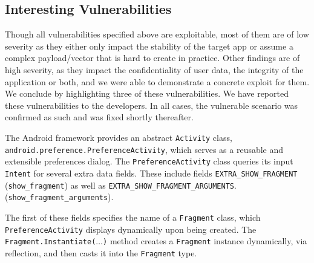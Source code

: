 \begin{table}
\begin{scriptsize}
\begin{center}
\begin{tabular}{l|c|c|c|c|c|c|c|c|c|c}
\end{tabular}
\end{center}
\end{scriptsize}
\end{table}

\subsection{Interesting Vulnerabilities}\label{Se:caseStudies}

Though all vulnerabilities specified above are exploitable, most of them are of 
low severity as they either only impact the stability of the target app or assume a complex payload/vector that is hard to create in practice.
%
Other findings are of high severity, as they impact the confidentiality of user data, the integrity of the application or both, and we were able to demonstrate a concrete exploit for them. We conclude by
highlighting three of these vulnerabilities. We have reported these vulnerabilities to the developers. In all cases, the vulnerable scenario was confirmed as such and was fixed shortly thereafter.

\label{Se:PreferenceActivities}
The Android framework provides an abstract {\tt Activity} class,\texttt{
android.preference.PreferenceActivity}, which serves as a reusable and extensible preferences dialog. 
The {\tt PreferenceActivity} class queries its input {\tt Intent} for several extra data fields. These include fields \texttt{EXTRA\_SHOW\_FRAGMENT}
(\texttt{show\_fragment}) 
as well as \texttt{EXTRA\_SHOW\_FRAGMENT\_ARGUMENTS}.
(\texttt{show\_fragment\_arguments}).

The first of these fields specifies the name 
of a \texttt{Fragment} class, which \texttt{PreferenceActivity}
displays dynamically upon being created. The {\tt Fragment.Instantiate($\ldots$)} method creates a {\tt Fragment} instance dynamically, via reflection, and then
casts it into the {\tt Fragment} type.

